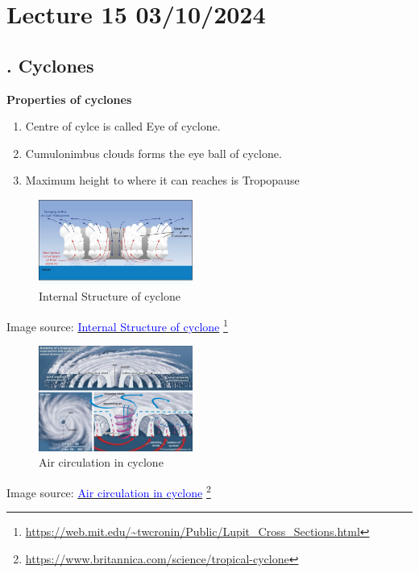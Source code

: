 \documentclass[fleqn,10pt]{SelfArx} %
\newcommand{\myhref}[2]{%
  \href{#1}{\textcolor{blue}{#2}}%
  \footnote{\url{#1}}%
}
\begin{document}
\clearpage

\section{Lecture 15 03/10/2024}

\subsection{. Cyclones}
\textbf{Properties of cyclones}
\begin{enumerate}[noitemsep]
    \item Centre of cylce is called Eye of cyclone.
    \item Cumulonimbus clouds forms the eye ball of cyclone.
    \item Maximum height to where it can reaches is Tropopause
\end{enumerate}

\begin{figure}[ht]
    \begin{center}
        \includegraphics[width=0.45\textwidth]{Figures/hurricane_structure.jpg}
    \end{center}
    \caption{Internal Structure of cyclone}\label{fig:cyclone_structure}
\end{figure}
Image source: \myhref{https://web.mit.edu/~twcronin/Public/Lupit_Cross_Sections.html}{Internal Structure of cyclone}

\begin{figure}[ht]
    \begin{center}
        \includegraphics[width=0.45\textwidth]{Figures/cyclone_air_circulation.png}
    \end{center}
    \caption{ Air circulation in cyclone}\label{fig:cyclone_air_circulation}
\end{figure}
Image source: \myhref{https://www.britannica.com/science/tropical-cyclone}{ Air circulation in cyclone}
\end{document}
